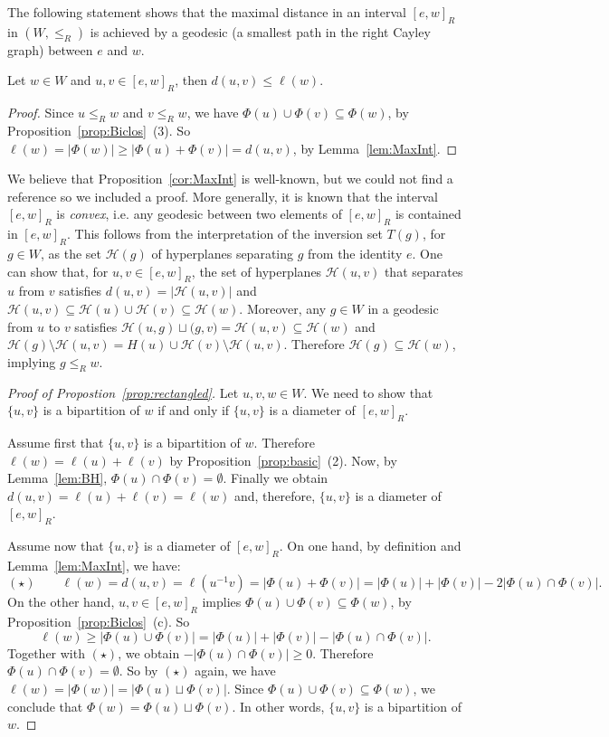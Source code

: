 \documentclass[Unicode]{cedram-alco}
\theoremstyle{definition}
\begin{document}
The following statement shows that the maximal distance in an interval $[e,w]_R$ in $(W,\leq_R)$ is achieved by a geodesic (a smallest path in the right Cayley graph) between $e$ and $w$.    

\begin{prop}\label{cor:MaxInt} Let $w\in W$  and $u,v\in [e,w]_R$, then $d(u,v)\leq \ell(w)$. 
\end{prop}
\begin{proof} Since $u\leq_R w$ and $v\leq_R w$, we have $\Phi(u)\cup\Phi(v)\subseteq \Phi(w)$, by Proposition~\ref{prop:Biclos}~(3). So 
$\ell(w)=|\Phi(w)|\geq |\Phi(u) + \Phi(v)|=d(u,v)$, by Lemma~\ref{lem:MaxInt}.
\end{proof}

\begin{remark} We believe that Proposition~\ref{cor:MaxInt} is well-known, but we could not find a reference so we included a proof. More generally, it is known that the interval $[e,w]_R$ is {\em convex}, i.e. any geodesic between two elements of $[e,w]_R$ is contained in  $[e,w]_R$. This follows from the interpretation of the inversion set $T(g)$, for $g\in W$,  as the set $\mathcal H(g)$ of hyperplanes separating $g$ from the identity $e$. One can show that, for  $u,v\in [e,w]_R$, the set of hyperplanes $\mathcal H(u,v)$ that separates $u$ from $v$ satisfies $d(u,v)=|\mathcal H(u,v)|$ and   $\mathcal H(u,v)\subseteq \mathcal H(u)\cup \mathcal H(v)\subseteq \mathcal H (w)$. Moreover, any $g\in W$ in a geodesic from $u$ to $v$ satisfies $\mathcal H(u,g) \sqcup \mathcal (g,v) =\mathcal H(u,v)\subseteq \mathcal H(w)$ and $\mathcal H(g)\setminus \mathcal H(u,v)= H(u)\cup \mathcal H(v)\setminus \mathcal H(u,v)$. Therefore $\mathcal H(g)\subseteq \mathcal H (w)$, implying $g\leq_R w$.
\end{remark}

\begin{proof}[Proof of Propostion~\ref{prop:rectangled}] Let $u,v,w\in W$. We need to show that $\{u,v\}$ is a bipartition of $w$ if and only if $\{u,v\}$ is a diameter of $[e,w]_R$. 

Assume first that $\{u,v\}$ is a bipartition of $w$. Therefore $\ell(w)=\ell(u)+\ell(v)$ by Proposition~\ref{prop:basic}~(2). Now, by Lemma~\ref{lem:BH}, $\Phi(u)\cap \Phi(v)=\emptyset$. Finally we obtain $d(u,v)=\ell(u)+\ell(v)=\ell(w)$ and, therefore, $\{u,v\}$ is a diameter of $[e,w]_R$. 

Assume now that $\{u,v\}$ is a diameter of $[e,w]_R$. On one hand, by definition and Lemma~\ref{lem:MaxInt}, we have:
$$
(\star)\qquad \ell(w)=d(u,v)=\ell(u^{-1}v)=|\Phi(u)+\Phi(v)|=|\Phi(u)|+|\Phi(v)|-2|\Phi(u)\cap\Phi(v)|.
$$  
On the other hand, $u,v\in [e,w]_R$ implies $\Phi(u)\cup\Phi(v)\subseteq \Phi(w)$, by Proposition~\ref{prop:Biclos}~(c). So
$$
\ell(w)\geq |\Phi(u)\cup \Phi(v)|=|\Phi(u)|+|\Phi(v)|-|\Phi(u)\cap \Phi(v)|.
$$
Together with $(\star)$, we obtain  $-|\Phi(u)\cap\Phi(v)|\geq 0$. Therefore $\Phi(u)\cap \Phi(v)=\emptyset$. So by $(\star)$ again, we have  $\ell(w) = |\Phi(w)|=|\Phi(u)\sqcup\Phi(v)|$. Since $\Phi(u)\cup\Phi(v)\subseteq \Phi(w)$, we conclude that $\Phi(w)=\Phi(u)\sqcup\Phi(v)$. In other words,  $\{u,v\}$ is a bipartition of $w$. 
 \end{proof}
\end{document}
